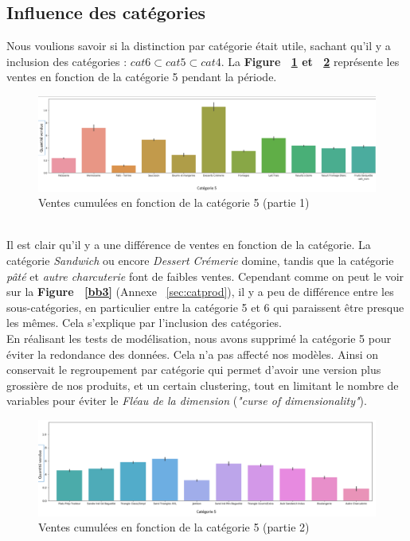\documentclass{article} %
\begin{document}
\subsection{Influence des catégories}
Nous voulions savoir si la distinction par catégorie était utile, sachant qu'il y a inclusion des catégories : $cat6 \subset cat5 \subset cat4$. La \textbf{Figure ~\ref{fig:cat5p1} et ~\ref{fig:cat5p2} } représente les ventes en fonction de la catégorie 5 pendant la période.\\ 
\begin{figure}[!h]
	\centering
	\includegraphics[keepaspectratio = true,scale=0.65]{categorie5part1.png}
	\caption{Ventes cumulées en fonction de la catégorie 5 (partie 1)}
	\label{fig:cat5p1}
\end{figure}
~\\
Il est clair qu'il y a une différence de ventes en fonction de la catégorie. La catégorie \textit{Sandwich} ou encore \textit{Dessert Crémerie} domine, tandis que la catégorie \textit{pâté} et \textit{autre charcuterie} font de faibles ventes. Cependant comme  on peut le voir sur la \textbf{Figure ~\ref{bb3}} (Annexe ~\ref{sec:catprod}), il y a peu de différence entre les sous-catégories, en particulier entre la catégorie 5 et 6 qui paraissent être presque les mêmes. Cela s'explique par l'inclusion des catégories.\\
En réalisant les tests de modélisation, nous avons supprimé la catégorie 5 pour éviter la redondance des données. Cela n'a pas affecté nos modèles. Ainsi on conservait le regroupement par catégorie qui permet d'avoir une version plus grossière de nos produits, et un certain clustering, tout en limitant le nombre de variables pour éviter le \textit{Fléau de la dimension} (\textit{"curse of dimensionality"}). 
\begin{figure}[!h]
	\centering
	\includegraphics[keepaspectratio = true,scale=0.65]{categorie5part2.png}
	\caption{Ventes cumulées en fonction de la catégorie 5 (partie 2)}
	\label{fig:cat5p2}
\end{figure}
\end{document}
